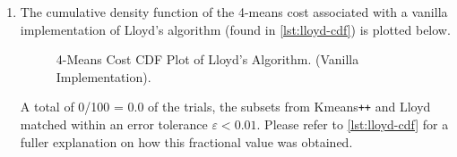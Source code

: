 \documentclass{article}
\begin{document}
\begin{enumerate}[leftmargin={*}, font={\bf}, label={\arabic*.}, ref={\arabic*}]
\begin{enumerate}[label={(\Alph*)}, ref={\theenumi(\Alph*)}]
\begin{enumerate}[label={(\roman*)}, ref={\theenumii(\roman*)}]
          \item
            The cumulative density function of the 4-means cost associated with a vanilla
            implementation of {\sf Lloyd}'s algorithm (found in \autoref{lst:lloyd-cdf})
            is plotted below.
            \begin{figure}[H]
              \centering
              \caption{
                4-Means Cost CDF Plot of {\sf Lloyd}'s Algorithm. (Vanilla Implementation).
              }
              \label{fig:4-means-cost-lloyd-kmeans-cdf-plot}
            \end{figure}
            A total of 0/100 = 0.0 of the trials, the subsets from {\sf Kmeans{\tt++}} and
            {\sf Lloyd} matched within an error tolerance $\varepsilon < 0.01$. Please refer
            to \autoref{lst:lloyd-cdf} for a fuller explanation on how this fractional value
            was obtained.
        \end{enumerate}


\end{enumerate}
\end{enumerate}
\end{document}
